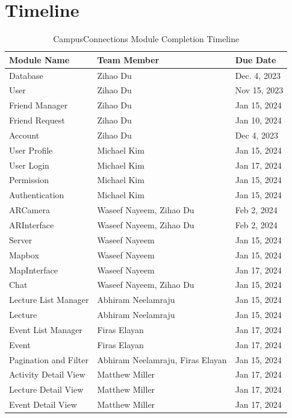 \documentclass[12pt, titlepage]{article}
\begin{document}
\section{Timeline}
\begin{table}[H]
\centering
\begin{tabular}{p{} p{}  p{}}
\toprule
Module Name & Team Member & Due Date \\
\midrule
Database & Zihao Du & Dec. 4, 2023\\
User & Zihao Du & Nov 15, 2023\\
Friend Manager & Zihao Du & Jan 15, 2024\\
Friend Request & Zihao Du & Jan 10, 2024\\
Account & Zihao Du & Dec 4, 2023\\
User Profile & Michael Kim & Jan 15, 2024\\
User Login & Michael Kim & Jan 17, 2024\\
Permission & Michael Kim & Jan 15, 2024\\
Authentication & Michael Kim & Jan 15, 2024\\
ARCamera &Waseef Nayeem, Zihao Du & Feb 2, 2024\\
ARInterface & Waseef Nayeem, Zihao Du & Feb 2, 2024\\
Server & Waseef Nayeem & Jan 15, 2024\\
Mapbox & Waseef Nayeem & Jan 15, 2024\\
MapInterface & Waseef Nayeem & Jan 17, 2024\\
Chat & Waseef Nayeem, Zihao Du & Jan 15, 2024\\
Lecture List Manager & Abhiram Neelamraju & Jan 15, 2024\\
Lecture & Abhiram Neelamraju & Jan 15, 2024\\
Event List Manager & Firas Elayan & Jan 17, 2024\\
Event & Firas Elayan & Jan 17, 2024\\
Pagination and Filter & Abhiram Neelamraju, Firas Elayan & Jan 15, 2024\\
Activity Detail View & Matthew Miller & Jan 17, 2024\\
Lecture Detail View & Matthew Miller & Jan 17, 2024\\
Event Detail View & Matthew Miller & Jan 17, 2024\\
\bottomrule
\end{tabular}
\caption{CampusConnections Module Completion Timeline}
\end{table}
\end{document}
